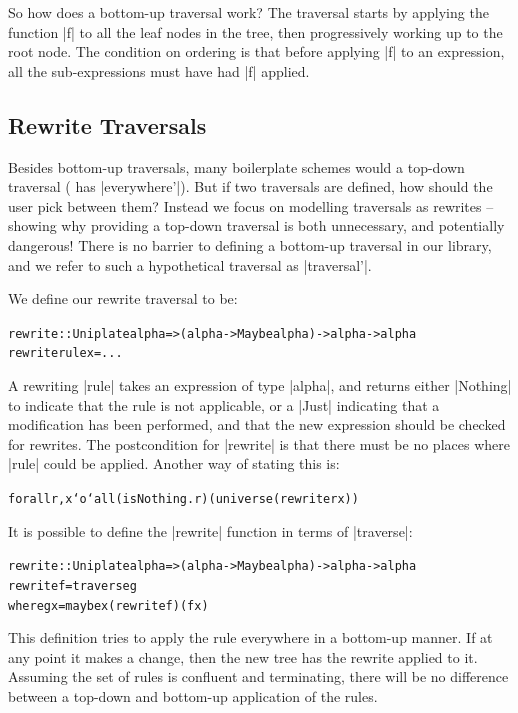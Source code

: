 \documentclass[preprint]{sigplanconf}
\newenvironment{code}{\begin{alltt}\small}{\end{alltt}}
\begin{document}
So how does a bottom-up traversal work? The traversal starts by applying the function |f| to all the leaf nodes in the tree, then progressively working up to the root node. The condition on ordering is that before applying |f| to an expression, all the sub-expressions must have had |f| applied.

\subsection{Rewrite Traversals}

Besides bottom-up traversals, many boilerplate schemes would a top-down traversal (\cite{lammel:syb} has |everywhere'|). But if two traversals are defined, how should the user pick between them? Instead we focus on modelling traversals as rewrites -- showing why providing a top-down traversal is both unnecessary, and potentially dangerous! There is no barrier to defining a bottom-up traversal in our library, and we refer to such a hypothetical traversal as |traversal'|.

We define our rewrite traversal to be:

\begin{code}
rewrite :: Uniplate alpha => (alpha -> Maybe alpha) -> alpha -> alpha
rewrite rule x = ...
\end{code}

A rewriting |rule| takes an expression of type |alpha|, and returns either |Nothing| to indicate that the rule is not applicable, or a |Just| indicating that a modification has been performed, and that the new expression should be checked for rewrites. The postcondition for |rewrite| is that there must be no places where |rule| could be applied. Another way of stating this is:

\begin{code}
forall r, x `o` all (isNothing . r) (universe (rewrite r x))
\end{code}

It is possible to define the |rewrite| function in terms of |traverse|:

\begin{code}
rewrite :: Uniplate alpha => (alpha -> Maybe alpha) -> alpha -> alpha
rewrite f = traverse g
    where g x = maybe x (rewrite f) (f x)
\end{code}

This definition tries to apply the rule everywhere in a bottom-up manner. If at any point it makes a change, then the new tree has the rewrite applied to it. Assuming the set of rules is confluent and terminating, there will be no difference between a top-down and bottom-up application of the rules.
\end{document}
